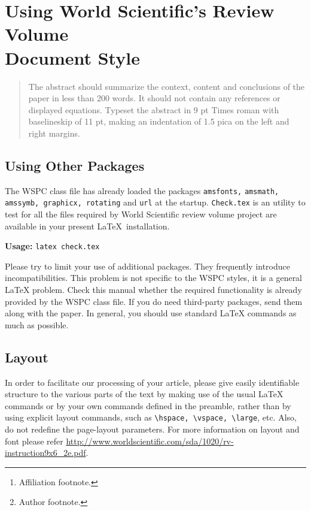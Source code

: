 \documentclass{ws-rv9x6}
\begin{document}
\chapter[Using World Scientific's Review Volume Document Style]{Using World Scientific's Review Volume\\ Document Style}\label{ra_ch1}

\author[F. Author and S. Author]{First Author and Second Author\footnote{Author footnote.}}

\address{World Scientific Publishing Co, Production Department,\\
5 Toh Tuck Link, Singapore 596224, \\
f\_author@wspc.com.sg\footnote{Affiliation footnote.}}

\begin{abstract}
The abstract should summarize the context, content and conclusions of
the paper in less than 200 words. It should not contain any references
or displayed equations. Typeset the abstract in 9 pt Times roman with
baselineskip of 11 pt, making an indentation of 1.5 pica on the left
and right margins.
\end{abstract}
\body


\section{Using Other Packages}\label{ra_sec1}
The WSPC class file has already loaded the packages \verb|amsfonts,|
\verb|amsmath, amssymb, graphicx, rotating| and \verb|url| at the
startup. \verb|Check.tex| is an utility to test for all the files
required by World Scientific review volume project are available in
your present \LaTeX\ installation.

{\bf Usage:} \verb|latex check.tex|

Please try to limit your use of additional packages. They frequently
introduce incompatibilities. This problem is not specific to the
WSPC styles, it is a general \LaTeX{} problem. Check this manual
whether the required functionality is already provided by the WSPC
class file. If you do need third-party packages, send them along
with the paper. In general, you should use standard \LaTeX{}
commands as much as possible.

\section{Layout}
In order to facilitate our processing of your article, please give
easily identifiable structure to the various parts of the text by
making use of the usual \LaTeX{} commands or by your own commands
defined in the preamble, rather than by using explicit layout
commands, such as \verb|\hspace, \vspace, \large|,
etc. Also, do not redefine the page-layout parameters. For more
information on layout and font please refer
\url{http://www.worldscientific.com/sda/1020/rv-instruction9x6_2e.pdf}.
\end{document}
